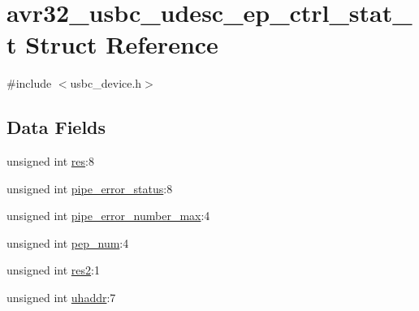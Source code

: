 \hypertarget{structavr32__usbc__udesc__ep__ctrl__stat__t}{
\section{avr32\-\_\-usbc\-\_\-udesc\-\_\-ep\-\_\-ctrl\-\_\-stat\-\_\-t \-Struct \-Reference}
\label{structavr32__usbc__udesc__ep__ctrl__stat__t}
}


{\ttfamily \#include $<$usbc\-\_\-device.\-h$>$}

\subsection*{\-Data \-Fields}
\begin{DoxyCompactItemize}
\item 
unsigned int \hyperlink{structavr32__usbc__udesc__ep__ctrl__stat__t_a834d36229bda069c7d36504f45bd917b}{res}\-:8
\item 
unsigned int \hyperlink{structavr32__usbc__udesc__ep__ctrl__stat__t_ace686bb729b57a30131cd73b536ece96}{pipe\-\_\-error\-\_\-status}\-:8
\item 
unsigned int \hyperlink{structavr32__usbc__udesc__ep__ctrl__stat__t_a217e487a51330e6afddb89c97a91107f}{pipe\-\_\-error\-\_\-number\-\_\-max}\-:4
\item 
unsigned int \hyperlink{structavr32__usbc__udesc__ep__ctrl__stat__t_a57b72d8cc46507cd1494c87c48234470}{pep\-\_\-num}\-:4
\item 
unsigned int \hyperlink{structavr32__usbc__udesc__ep__ctrl__stat__t_af88c1fe164150c905432dc87aa03d84a}{res2}\-:1
\item 
unsigned int \hyperlink{structavr32__usbc__udesc__ep__ctrl__stat__t_a22eed9d1aca4da507f8927d8db4f73fe}{uhaddr}\-:7
\end{DoxyCompactItemize}


